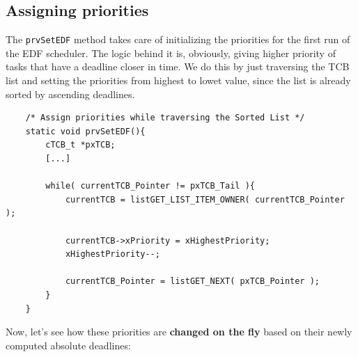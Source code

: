 \documentclass[10pt]{article}
\begin{document}
\subsection{Assigning priorities}
The \verb|prvSetEDF| method takes care of initializing the priorities for the first run of the EDF scheduler. The logic behind it is, obviously, giving higher priority of tasks that have a deadline closer in time. We do this by just traversing the TCB list and setting the priorities from highest to lowet value, since the list is already sorted by ascending deadlines.
\begin{lstlisting}
    /* Assign priorities while traversing the Sorted List */
    static void prvSetEDF(){
        cTCB_t *pxTCB;
        [...]

        while( currentTCB_Pointer != pxTCB_Tail ){
            currentTCB = listGET_LIST_ITEM_OWNER( currentTCB_Pointer );
            
            currentTCB->xPriority = xHighestPriority;
            xHighestPriority--;

            currentTCB_Pointer = listGET_NEXT( pxTCB_Pointer );
        }
    }
\end{lstlisting}
Now, let's see how these priorities are \textbf{changed on the fly} based on their newly computed absolute deadlines:
\end{document}
